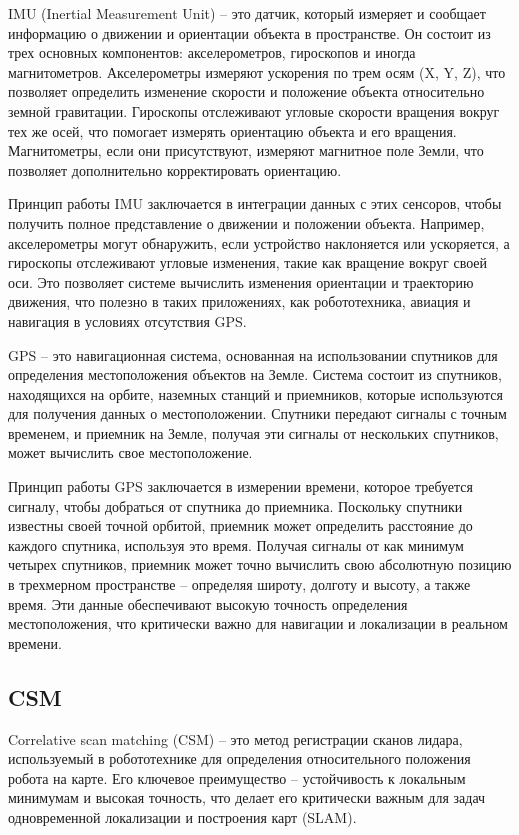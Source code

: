 IMU (Inertial Measurement Unit) -- это датчик, который измеряет и сообщает
информацию о движении и ориентации объекта в пространстве. Он состоит из трех
основных компонентов: акселерометров, гироскопов и иногда магнитометров.
Акселерометры измеряют ускорения по трем осям (X, Y, Z), что позволяет
определить изменение скорости и положение объекта относительно земной
гравитации. Гироскопы отслеживают угловые скорости вращения вокруг тех же осей,
что помогает измерять ориентацию объекта и его вращения. Магнитометры, если они
присутствуют, измеряют магнитное поле Земли, что позволяет дополнительно
корректировать ориентацию.

Принцип работы IMU заключается в интеграции данных с этих сенсоров, чтобы
получить полное представление о движении и положении объекта. Например,
акселерометры могут обнаружить, если устройство наклоняется или ускоряется, а
гироскопы отслеживают угловые изменения, такие как вращение вокруг своей оси.
Это позволяет системе вычислить изменения ориентации и траекторию движения, что
полезно в таких приложениях, как робототехника, авиация и навигация в условиях
отсутствия GPS.

GPS -- это навигационная система, основанная на использовании спутников для
определения местоположения объектов на Земле. Система состоит из спутников,
находящихся на орбите, наземных станций и приемников, которые используются для
получения данных о местоположении. Спутники передают сигналы с точным временем,
и приемник на Земле, получая эти сигналы от нескольких спутников, может
вычислить свое местоположение.

Принцип работы GPS заключается в измерении времени, которое требуется сигналу,
чтобы добраться от спутника до приемника. Поскольку спутники известны своей
точной орбитой, приемник может определить расстояние до каждого спутника,
используя это время. Получая сигналы от как минимум четырех спутников, приемник
может точно вычислить свою абсолютную позицию в трехмерном пространстве --
определяя широту, долготу и высоту, а также время. Эти данные обеспечивают
высокую точность определения местоположения, что критически важно для навигации
и локализации в реальном времени.

\subsection{CSM}
Correlative scan matching (CSM) -- это метод регистрации сканов лидара,
используемый в робототехнике для определения относительного положения робота на
карте. Его ключевое преимущество -- устойчивость к локальным минимумам и высокая точность, что делает его критически важным для задач одновременной локализации и построения карт (SLAM).

